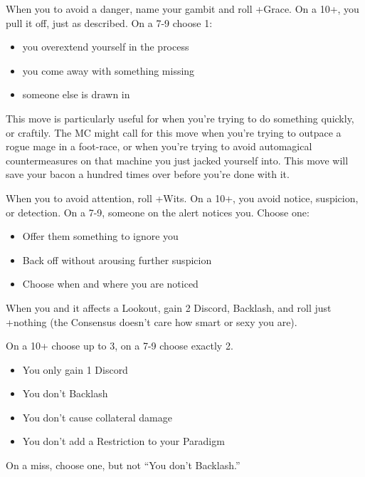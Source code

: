 \begin{multicols}{3}
  \begin{move}
    When you  to avoid a
    danger, name your gambit and roll +Grace. On a 10+, you pull it
    off, just as described. On a 7-9 choose 1:
    \begin{itemize}
      \setlength\itemsep{0em}
      \item you overextend yourself in the process
      \item you come away with something missing
      \item someone else is drawn in
    \end{itemize}
\begin{movedetail}
  This move is particularly useful for when you're trying to do
  something quickly, or craftily. The MC might call for this move when
  you're trying to outpace a rogue mage in a foot-race, or when you're
  trying to avoid automagical countermeasures on that machine you just
  jacked yourself into. This move will save your bacon a hundred times
  over before you're done with it.
\end{movedetail}
  \end{move}

  \SEPARATOR

  \begin{move}
    When you  to avoid attention, roll
    +Wits. On a 10+, you avoid notice, suspicion, or detection. On a
    7-9, someone on the alert notices you. Choose one:
    \begin{itemize}
      \setlength\itemsep{0em}
    \item Offer them something to ignore you
    \item Back off without arousing further suspicion
    \item Choose when and where you are noticed
    \end{itemize}
  \end{move}

  \SEPARATOR

  \begin{move}
    When you  and it affects a Lookout, gain
    2 Discord, Backlash, and roll just +nothing (the Consensus doesn't
    care how smart or sexy you are).

    On a 10+ choose up to 3, on a 7-9 choose exactly 2.
    \begin{itemize}
      \setlength\itemsep{0em}
    \item You only gain 1 Discord
    \item You don't Backlash
    \item You don't cause collateral damage
    \item You don't add a Restriction to your Paradigm
    \end{itemize}
    On a miss, choose one, but not ``You don't Backlash.''
  \end{move}


\end{multicols}
